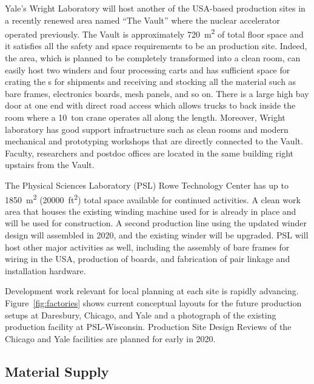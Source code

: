 Yale's Wright Laboratory will host another of the USA-based  production sites in a recently renewed area named ``The Vault'' where the nuclear accelerator operated previously.  The Vault is approximately \SI{720}{m^2} of total floor space and it satisfies all the safety and space requirements to be an  production site. 
Indeed, the area, which is planned to be completely transformed into a clean room, can easily host two winders and four processing carts and has sufficient space for crating the s for shipments and receiving and stocking all the material such as bare frames, electronics boards, mesh panels, and so on. There is a large high bay door at one end with direct road access which allows trucks to back inside the room where a \SI{10}{ton} crane operates all along the length.  Moreover, Wright laboratory has good support infrastructure such as clean rooms and modern mechanical and prototyping workshops that are directly connected to the Vault. Faculty, researchers and postdoc offices are located in the same building right upstairs from the Vault.

The Physical Sciences Laboratory (PSL) Rowe Technology Center has up to \SI{1850}{m^2} (\SI{20000}{ft^2}) total space available for continued  activities.  A clean work area that houses the existing winding machine used for  is already in place and will be used for   construction. A second  production line using the updated winder design will assembled in 2020, and the existing winder will be upgraded.  PSL will host other major activities as well, including the assembly of bare  frames for wiring in the USA, production of  boards, and fabrication of  pair linkage and installation hardware.

Development work relevant for local planning at each site is rapidly advancing.  Figure~\ref{fig:factories} shows current conceptual layouts for the future production setups at Daresbury, Chicago, and Yale and a photograph of the existing  production facility at PSL-Wisconsin.  Production Site Design Reviews of the Chicago and Yale facilities are planned for early in 2020. 

\subsection{Material Supply}  
\label{sec:fdsp-apa-prod-supply}

